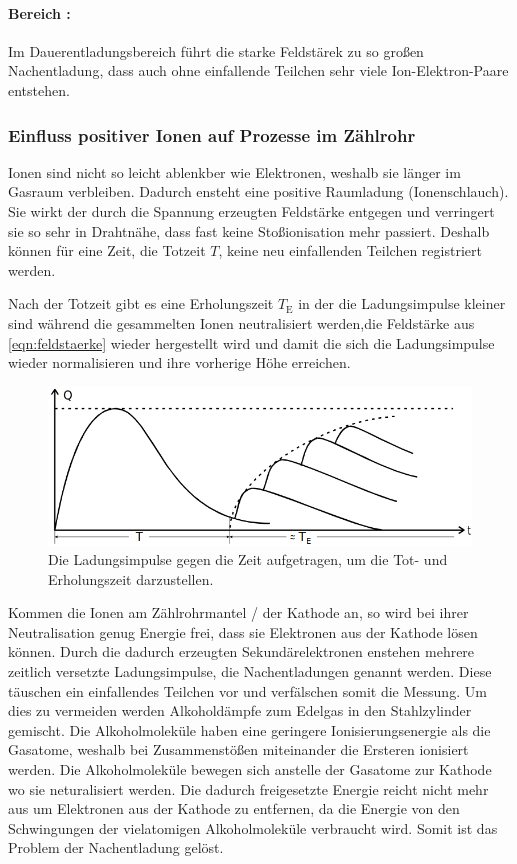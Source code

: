 \documentclass[titlepage = firstcover]{scrartcl}
\newcommand{\RN}[1]{\uppercase\expandafter{\romannumeral#1}}
\begin{document}
          \paragraph{Bereich \RN{4}:}
            Im Dauerentladungsbereich führt die starke Feldstärek zu so großen Nachentladung, dass auch ohne einfallende Teilchen sehr viele Ion-Elektron-Paare entstehen.

        \subsubsection{Einfluss positiver Ionen auf Prozesse im Zählrohr}
          Ionen sind nicht so leicht ablenkber wie Elektronen, weshalb sie länger im Gasraum verbleiben. Dadurch ensteht eine positive Raumladung (Ionenschlauch). Sie wirkt der durch die Spannung erzeugten Feldstärke entgegen und verringert sie so sehr in Drahtnähe, dass fast keine Stoßionisation mehr passiert. Deshalb können für eine Zeit, die Totzeit $T$, keine neu einfallenden Teilchen registriert werden.

          Nach der Totzeit gibt es eine Erholungszeit $T_{\text{E}}$ in der die Ladungsimpulse kleiner sind während die gesammelten Ionen neutralisiert werden,die Feldstärke aus \autoref{eqn:feldstaerke} wieder hergestellt wird und damit die sich die Ladungsimpulse wieder normalisieren und ihre vorherige Höhe erreichen.
          \begin{figure}[h]
            \centering
            \includegraphics[width = 0.7\linewidth]{totzeit_erholungszeit.png}
            \caption{Die Ladungsimpulse gegen die Zeit aufgetragen, um die Tot- und Erholungszeit darzustellen.}
            \label{fig:totzeit_erholungszeit}
          \end{figure}
          \FloatBarrier

          Kommen die Ionen am Zählrohrmantel / der Kathode an, so wird bei ihrer Neutralisation genug Energie frei, dass sie Elektronen aus der Kathode lösen können. Durch die dadurch erzeugten Sekundärelektronen enstehen mehrere zeitlich versetzte Ladungsimpulse, die Nachentladungen genannt werden. Diese täuschen ein einfallendes Teilchen vor und verfälschen somit die Messung. Um dies zu vermeiden werden Alkoholdämpfe zum Edelgas in den Stahlzylinder gemischt. Die Alkoholmoleküle haben eine geringere Ionisierungsenergie als die Gasatome, weshalb bei Zusammenstößen miteinander die Ersteren ionisiert werden. Die Alkoholmoleküle bewegen sich anstelle der Gasatome zur Kathode wo sie neturalisiert werden. Die dadurch freigesetzte Energie reicht nicht mehr aus um Elektronen aus der Kathode zu entfernen, da die Energie von den Schwingungen der vielatomigen Alkoholmoleküle verbraucht wird. Somit ist das Problem der Nachentladung gelöst.
\end{document}
